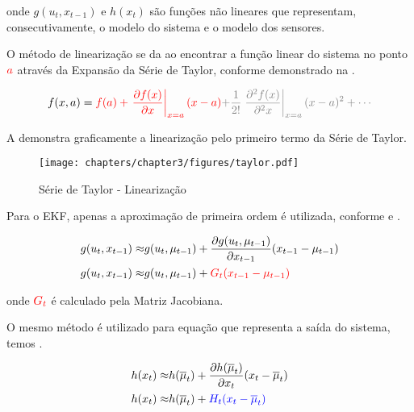 \noindent onde $g(u_t, x_{t-1})$ e $h(x_t)$ são funções não lineares que representam, consecutivamente, 
o modelo do sistema e o modelo dos sensores.

O método de linearização se da ao encontrar a função linear do sistema no ponto $\textcolor{red}{a}$ através da Expansão da Série de Taylor, conforme demonstrado na .

\begin{equation}
    f(x,a) = \textcolor{red}{f(a) + \left. \frac{\partial f(x)}{\partial x} \right\vert_{x=a}(x-a)}
    \textcolor{gray}{+\frac{1}{2!}\left. \frac{\partial^2 f(x)}{\partial^2 x} \right\vert_{x=a}(x-a)^2 + \cdots}
    \label{eq:taylor1}
\end{equation}

A  demonstra graficamente a linearização pelo primeiro termo da Série de Taylor.

\begin{figure}[!ht]
    \centering
    \texttt{[image: chapters/chapter3/figures/taylor.pdf]}
    \caption{Série de Taylor - Linearização}
    \label{fig:taylor}
\end{figure}

Para o EKF, apenas a aproximação de primeira ordem é utilizada, conforme  e .

\begin{equation}
    \label{eq:taylor2}
    \begin{split}
        g(u_t, x_{t-1}) \approx & g(u_t, \mu_{t-1}) + \frac{\partial g(u_t, \mu_{t-1}) }{\partial x_{t-1}}(x_{t-1}-\mu_{t-1}) \\
        g(u_t, x_{t-1}) \approx & g(u_t, \mu_{t-1}) + \color{red}{G_t}(x_{t-1}-\mu_{t-1})
    \end{split}
\end{equation}

\noindent onde $\color{red}G_t$ é calculado pela Matriz Jacobiana.

O mesmo método é utilizado para equação que representa a saída do sistema, temos .

\begin{equation}
    \label{eq:taylor4}
    \begin{split}
        h(x_t) \approx & h(\overline{\mu}_t) + \frac{\partial h(\overline{\mu}_t) }{\partial x_{t}}(x_{t}-\overline{\mu}_{t}) \\
        h(x_t) \approx & h(\overline{\mu}_t) + \color{blue}{H_t}(x_{t}-\overline{\mu}_{t})
    \end{split}
\end{equation}

